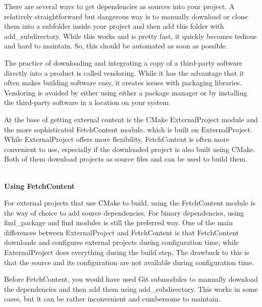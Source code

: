 

There are several ways to get dependencies as sources into your project. A relatively straightforward but dangerous way is to manually download or clone them into a subfolder inside your project and then add this folder with add\_subdirectory. While this works and is pretty fast, it quickly becomes tedious and hard to maintain. So, this should be automated as soon as possible.

\begin{tcolorbox}[colback=webgreen!5!white,colframe=webgreen!75!black,title=Note]
The practice of downloading and integrating a copy of a third-party software directly into a product is called vendoring. While it has the advantage that it often makes building software easy, it creates issues with packaging libraries. Vendoring is avoided by either using either a package manager or by installing the third-party software in a location on your system.
\end{tcolorbox}


At the base of getting external content is the CMake ExternalProject module and the more sophisticated FetchContent module, which is built on ExternalProject. While ExternalProject offers more flexibility, FetchContent is often more convenient to use, especially if the downloaded project is also built using CMake. Both of them download projects as source files and can be used to build them.

\hspace*{\fill} \\ %
\noindent
\textbf{Using FetchContent}

For external projects that use CMake to build, using the FetchContent module is the way of choice to add source dependencies. For binary dependencies, using find\_package and find modules is still the preferred way. One of the main differences between ExternalProject and FetchContent is that FetchContent downloads and configures external projects during configuration time, while ExternalProject does everything during the build step. The drawback to this is that the source and its configuration are not available during configuration time.

Before FetchContent, you would have used Git submodules to manually download the dependencies and then add them using add\_subdirectory. This works in some cases, but it can be rather inconvenient and cumbersome to maintain.

